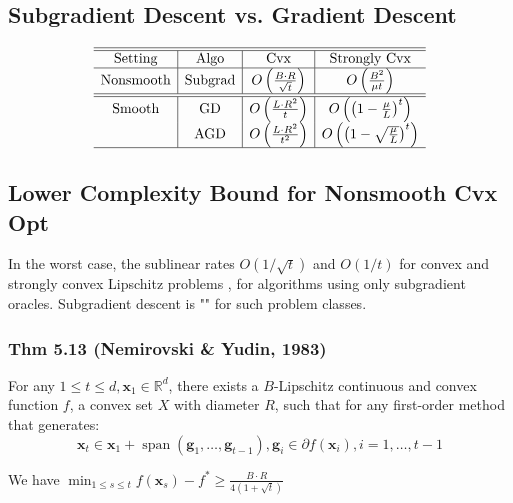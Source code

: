 \subsection*{Subgradient Descent vs. Gradient Descent}
$$
\begin{array}{c|c|c|c}
\hline \hline \text {Setting} & \text {Algo} & \text {Cvx} & \text {Strongly Cvx} \\
\hline \text {Nonsmooth} & \text {Subgrad} & O\left(\frac{B \cdot R}{\sqrt{t}}\right) & O\left(\frac{B^{2}}{\mu t}\right) \\
\hline \hline \text {Smooth} & \text {GD} & O\left(\frac{L \cdot R^{2}}{t}\right) & O\left(\left(1-\frac{\mu}{L}\right)^{t}\right) \\
& \text {AGD} & O\left(\frac{L \cdot R^{2}}{t^{2}}\right) & O\left(\left(1-\sqrt{\frac{\mu}{L}}\right)^{t}\right) \\
\hline
\end{array}
$$




\subsection*{Lower Complexity Bound for Nonsmooth Cvx Opt}
In the worst case, the sublinear rates $O(1 / \sqrt{t})$ and $O(1 / t)$ for convex and strongly convex Lipschitz problems , for algorithms using only subgradient oracles. Subgradient descent is ""  for such problem classes.
\subsubsection*{Thm 5.13 (Nemirovski \& Yudin, 1983)}
For any $1 \leq t \leq d, \mathbf{x}_{1} \in \mathbb{R}^{d}$, there exists a $B$-Lipschitz continuous and convex function $f$, a convex set $X$ with diameter $R$, such that for any first-order method that generates:
$$\mathbf{x}_{t} \in \mathbf{x}_{1}+\operatorname{span}\left(\mathbf{g}_{1}, \ldots, \mathbf{g}_{t-1}\right), \mathbf{g}_{i} \in \partial f\left(\mathbf{x}_{i}\right), i=1, \ldots, t-1$$

We have $\min _{1 \leq s \leq t} f\left(\mathbf{x}_{s}\right)-f^{*} \geq \frac{B \cdot R}{4(1+\sqrt{t})}$